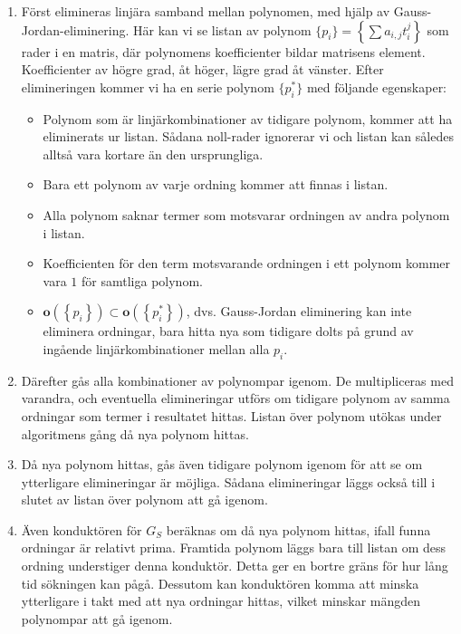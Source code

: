 \begin{enumerate}
\item Först elimineras linjära samband mellan polynomen, med hjälp av Gauss-Jordan-eliminering. Här kan vi se listan av polynom $\{p_i\}=\left\{\sum a_{i,j} t_i^j\right\}$ som rader i en matris, där polynomens koefficienter bildar matrisens element. Koefficienter av högre grad, åt höger, lägre grad åt vänster. Efter elimineringen kommer vi ha en serie polynom $\{p_i^*\}$ med följande egenskaper:
\begin{itemize}
\item Polynom som är linjärkombinationer av tidigare polynom, kommer att ha eliminerats ur listan. Sådana noll-rader ignorerar vi och listan kan således alltså vara kortare än den ursprungliga.

\item Bara ett polynom av varje ordning kommer att finnas i listan.

\item Alla polynom saknar termer som motsvarar ordningen av andra polynom i listan.

\item Koefficienten för den term motsvarande ordningen i ett polynom kommer vara $1$ för samtliga polynom.

\item $\mathbf{o}(\left\{p_i\right\}) \subset \mathbf{o}(\left\{p_i^*\right\})$, dvs. Gauss-Jordan eliminering kan inte eliminera ordningar, bara hitta nya som tidigare dolts på grund av ingående linjärkombinationer mellan alla $p_i$.
\end{itemize}

\item Därefter gås alla kombinationer av polynompar igenom. De multipliceras med varandra, och eventuella elimineringar utförs om tidigare polynom av samma ordningar som termer i resultatet hittas. Listan över polynom utökas under algoritmens gång då nya polynom hittas.

\item Då nya polynom hittas, gås även tidigare polynom igenom för att se om ytterligare elimineringar är möjliga. Sådana elimineringar läggs också till i slutet av listan över polynom att gå igenom. 

\item Även konduktören för $G_S$ beräknas om då nya polynom hittas, ifall funna ordningar är relativt prima. Framtida polynom läggs bara till listan om dess ordning understiger denna konduktör. Detta ger en bortre gräns för hur lång tid sökningen kan pågå. Dessutom kan konduktören komma att minska ytterligare i takt med att nya ordningar hittas, vilket minskar mängden polynompar att gå igenom.


\end{enumerate}
